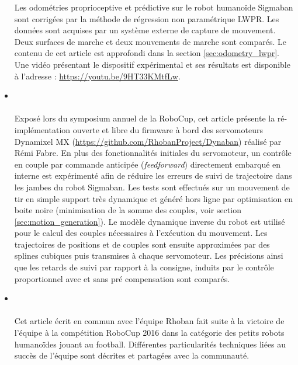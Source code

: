 \begin{itemize}
        Les odométries proprioceptive et prédictive sur le robot humanoïde Sigmaban 
        sont corrigées par la méthode de régression non paramétrique LWPR.
        Les données sont acquises par un système externe de capture de mouvement.
        Deux surfaces de marche et deux mouvements de marche sont comparés.
        Le contenu de cet article est approfondi dans la section \ref{sec:odometry_lwpr}.
        Une vidéo présentant le dispositif expérimental et ses résultats est disponible
        à l'adresse : \url{https://youtu.be/9HT33KMtfLw}.\\
    \item \footnotesize{}\normalsize\leavevmode\\\\
        Exposé lors du symposium annuel de la RoboCup, cet article présente la
        ré-implémentation ouverte et libre du firmware à bord des 
        servomoteurs Dynamixel MX (\url{https://github.com/RhobanProject/Dynaban}) 
        réalisé par Rémi Fabre.
        En plus des fonctionnalités initiales du servomoteur, 
        un contrôle en couple par commande anticipée
        (\textit{feedforward}) directement embarqué en interne
        est expérimenté afin de réduire les 
        erreurs de suivi de trajectoire dans les jambes du robot Sigmaban.
        Les tests sont effectués sur un mouvement de tir en simple support très dynamique
        et généré hors ligne par optimisation en boite noire 
        (minimisation de la somme des couples, voir section \ref{sec:motion_generation}).
        Le modèle dynamique inverse du robot est utilisé pour le calcul des couples
        nécessaires à l'exécution du mouvement. 
        Les trajectoires de positions et de couples sont ensuite approximées par des
        splines cubiques puis transmises à chaque servomoteur.
        Les précisions ainsi que les retards de suivi par rapport à la consigne, induits par 
        le contrôle proportionnel avec et sans pré compensation sont comparés.\\
    \item \footnotesize{}\normalsize\leavevmode\\\\
        Cet article écrit en commun avec l'équipe Rhoban fait suite à la victoire de
        l'équipe à la compétition RoboCup 2016 dans la catégorie des petits robots humanoïdes
        jouant au football.
        Différentes particularités techniques liées au succès de l'équipe sont décrites et 
        partagées avec la communauté.

\end{itemize}
